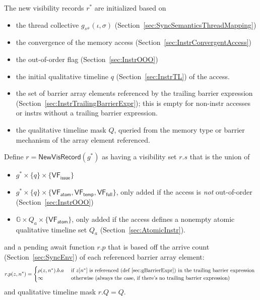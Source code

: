 The new visibility records $r^*$ are initialized based on
\begin{itemize}
  \item the thread collective $g_{s^\#}(\iota, \sigma)$ (Section~\ref{sec:SyncSemanticsThreadMapping})
  \item the convergence of the memory access (Section~\ref{sec:InstrConvergentAccess})
  \item the out-of-order flag (Section~\ref{sec:InstrOOO})
  \item the initial qualitative timeline $q$ (Section~\ref{sec:InstrTL}) of the access.
  \item the set of barrier array elements referenced by the trailing barrier expression (Section~\ref{sec:InstrTrailingBarrierExpr}); this is empty for non-instr accesses or instrs without a trailing barrier expression.
  \item the qualitative timeline mask $Q$, queried from the memory type or barrier mechanism of the array element referenced.
\end{itemize}

Define $r = \mathsf{NewVisRecord}(g^*)$ as having a visibility set $r.s$ that is the union of
\begin{itemize}
    \item $g^* \times \{ q \} \times \{ \mathsf{VF_{issue}} \}$
    \item $g^* \times \{ q \} \times \{ \mathsf{VF_{atom}}, \mathsf{VF_{temp}}, \mathsf{VF_{full}} \}$, only added if the access is \emph{not} out-of-order (Section~\ref{sec:InstrOOO})
    \item $\mathbb{G} \times Q_a \times \{ \mathsf{VF_{atom}} \}$, only added if the access defines a nonempty atomic qualitative timeline set $Q_a$ (Section~\ref{sec:AtomicInstr}).
\end{itemize}
and a pending await function $r.p$ that is based off the arrive count (Section~\ref{sec:SyncEnv}) of each referenced barrier array element:
\begin{equation*}
    r.p(z, n^*) = \begin{cases}
      \rho(z, n^*).b.a & \text{ if } z[n^*] \text{ is referenced (def~\ref{sec:gBarrierExpr}) in the trailing barrier expression } \\
      \infty & \text{ otherwise (always the case, if there's no trailing barrier expression)}
    \end{cases}
\end{equation*}
and qualitative timeline mask $r.Q = Q$.

